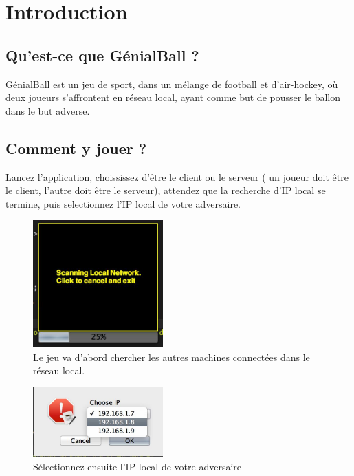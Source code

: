 \chapter{Introduction}

\section{Qu'est-ce que GénialBall ?}

GénialBall est un jeu de sport, dans un mélange de football et d’air-hockey, où deux joueurs s’affrontent en réseau local, ayant comme but de pousser le ballon dans le but adverse.\\

\section{Comment y jouer ?}

Lancez l'application, choississez d'être le client ou le serveur ( un joueur doit être le client, l'autre doit être le serveur), attendez que la recherche d'IP local se termine, puis selectionnez l'IP local de votre adversaire.
\begin{figure}[!h]
\begin{center}
\includegraphics[width=5cm]{./ScanningNetwork}
\caption{Le jeu va d'abord chercher les autres machines connectées dans le réseau local.}
\end{center}
\end{figure}

\begin{figure}[!h]
\begin{center}
\includegraphics[width=5cm]{./ChooseYourIp}
\caption{Sélectionnez ensuite l'IP local de votre adversaire}
\end{center}
\end{figure}

